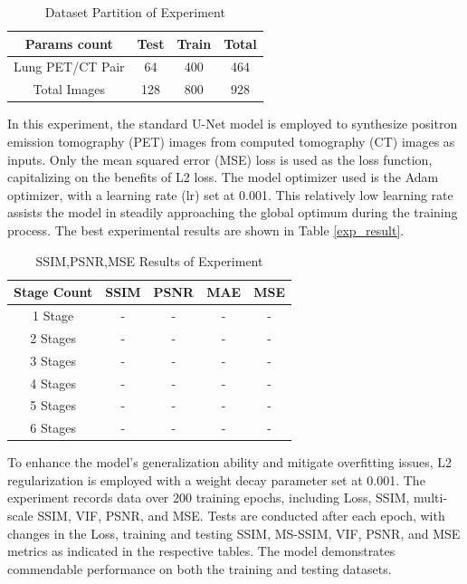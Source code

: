 \documentclass[twocolumn]{article}
\begin{document}
\begin{table}[h]
	\centering
	\caption{Dataset Partition of Experiment}
	\label{tab:dataset_partition_1}
	\begin{tabular}{cccc}
		\toprule
		Params count     & Test & Train & Total \\
		\midrule
		Lung PET/CT Pair & 64   & 400   & 464   \\
		Total Images     & 128  & 800   & 928   \\
		\bottomrule
	\end{tabular}
\end{table}

In this experiment, the standard U-Net model is employed to synthesize positron emission tomography (PET) images from computed tomography (CT) images as inputs. Only the mean squared error (MSE) loss is used as the loss function, capitalizing on the benefits of L2 loss. The model optimizer used is the Adam optimizer, with a learning rate (lr) set at 0.001. This relatively low learning rate assists the model in steadily approaching the global optimum during the training process. The best experimental results are shown in Table \ref{exp_result}.

\begin{table}[h]
	\centering
	\caption{SSIM,PSNR,MSE Results of Experiment}
	\label{tab:exp_result}
	\begin{tabular}{ccccc}
		\toprule
		Stage Count & SSIM   & PSNR    & MAE & MSE    \\
		\midrule
		1 Stage       & - & - & -   & - \\
		2 Stages       & - & - & -   & - \\
		3 Stages       & - & - & -   & - \\
		4 Stages       & - & - & -   & - \\
		5 Stages       & - & - & -   & - \\
		6 Stages       & - & - & -   & - \\
		\bottomrule
	\end{tabular}
\end{table}


To enhance the model's generalization ability and mitigate overfitting issues, L2 regularization is employed with a weight decay parameter set at 0.001. The experiment records data over 200 training epochs, including Loss, SSIM, multi-scale SSIM, VIF, PSNR, and MSE. Tests are conducted after each epoch, with changes in the Loss, training and testing SSIM, MS-SSIM, VIF, PSNR, and MSE metrics as indicated in the respective tables. The model demonstrates commendable performance on both the training and testing datasets.
\end{document}
